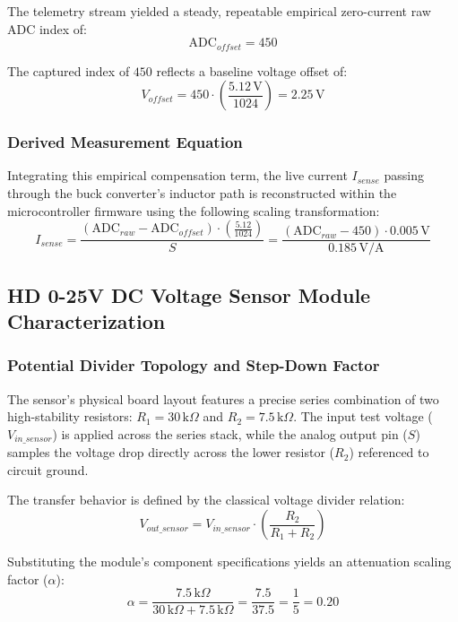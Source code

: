 \documentclass[12pt,a4paper]{article}
\begin{document}
The telemetry stream yielded a steady, repeatable empirical zero-current raw ADC index of:
\begin{equation}
\text{ADC}_{offset} = 450
\end{equation}

The captured index of $450$ reflects a baseline voltage offset of:
\begin{equation}
V_{offset} = 450 \cdot \left(\frac{5.12\,\text{V}}{1024}\right) = 2.25\,\text{V}
\end{equation}

\subsubsection{Derived Measurement Equation}
Integrating this empirical compensation term, the live current $I_{sense}$ passing through the buck converter's inductor path is reconstructed within the microcontroller firmware using the following scaling transformation:
\begin{equation}
I_{sense} = \frac{\left(\text{ADC}_{raw} - \text{ADC}_{offset}\right) \cdot \left(\frac{5.12}{1024}\right)}{S} = \frac{\left(\text{ADC}_{raw} - 450\right) \cdot 0.005\,\text{V}}{0.185\,\text{V/A}}
\end{equation}

\subsection{HD 0-25V DC Voltage Sensor Module Characterization}
\subsubsection{Potential Divider Topology and Step-Down Factor}
The sensor's physical board layout features a precise series combination of two high-stability resistors: $R_1 = 30\,\text{k}\Omega$ and $R_2 = 7.5\,\text{k}\Omega$. The input test voltage ($V_{in\_sensor}$) is applied across the series stack, while the analog output pin ($S$) samples the voltage drop directly across the lower resistor ($R_2$) referenced to circuit ground.

The transfer behavior is defined by the classical voltage divider relation:
\begin{equation}
V_{out\_sensor} = V_{in\_sensor} \cdot \left( \frac{R_2}{R_1 + R_2} \right)
\end{equation}

Substituting the module's component specifications yields an attenuation scaling factor ($\alpha$):
\begin{equation}
\alpha = \frac{7.5\,\text{k}\Omega}{30\,\text{k}\Omega + 7.5\,\text{k}\Omega} = \frac{7.5}{37.5} = \frac{1}{5} = 0.20
\end{equation}
\end{document}
